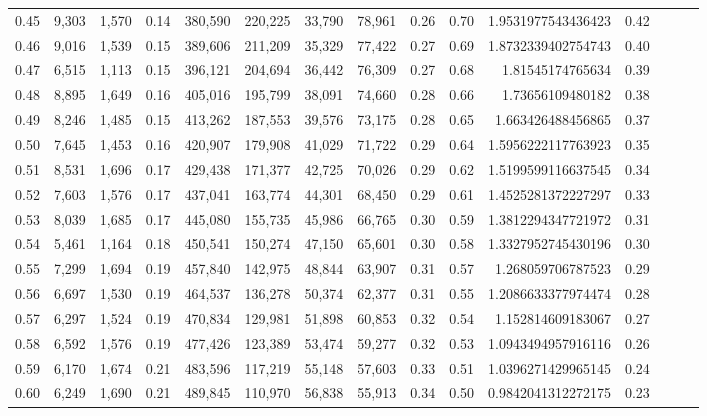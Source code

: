 \begin{tabular}{rrrrrrrrrrrrrrr}
0.45 &   9,303 &  1,570 &  0.14 &  380,590 &  220,225 &   33,790 &   78,961 &  0.26 &  0.70 &    1.9531977543436423 &      0.42 \\
0.46 &   9,016 &  1,539 &  0.15 &  389,606 &  211,209 &   35,329 &   77,422 &  0.27 &  0.69 &    1.8732339402754743 &      0.40 \\
0.47 &   6,515 &  1,113 &  0.15 &  396,121 &  204,694 &   36,442 &   76,309 &  0.27 &  0.68 &      1.81545174765634 &      0.39 \\
0.48 &   8,895 &  1,649 &  0.16 &  405,016 &  195,799 &   38,091 &   74,660 &  0.28 &  0.66 &      1.73656109480182 &      0.38 \\
0.49 &   8,246 &  1,485 &  0.15 &  413,262 &  187,553 &   39,576 &   73,175 &  0.28 &  0.65 &     1.663426488456865 &      0.37 \\
0.50 &   7,645 &  1,453 &  0.16 &  420,907 &  179,908 &   41,029 &   71,722 &  0.29 &  0.64 &    1.5956222117763923 &      0.35 \\
0.51 &   8,531 &  1,696 &  0.17 &  429,438 &  171,377 &   42,725 &   70,026 &  0.29 &  0.62 &    1.5199599116637545 &      0.34 \\
0.52 &   7,603 &  1,576 &  0.17 &  437,041 &  163,774 &   44,301 &   68,450 &  0.29 &  0.61 &    1.4525281372227297 &      0.33 \\
0.53 &   8,039 &  1,685 &  0.17 &  445,080 &  155,735 &   45,986 &   66,765 &  0.30 &  0.59 &    1.3812294347721972 &      0.31 \\
0.54 &   5,461 &  1,164 &  0.18 &  450,541 &  150,274 &   47,150 &   65,601 &  0.30 &  0.58 &    1.3327952745430196 &      0.30 \\
0.55 &   7,299 &  1,694 &  0.19 &  457,840 &  142,975 &   48,844 &   63,907 &  0.31 &  0.57 &     1.268059706787523 &      0.29 \\
0.56 &   6,697 &  1,530 &  0.19 &  464,537 &  136,278 &   50,374 &   62,377 &  0.31 &  0.55 &    1.2086633377974474 &      0.28 \\
0.57 &   6,297 &  1,524 &  0.19 &  470,834 &  129,981 &   51,898 &   60,853 &  0.32 &  0.54 &     1.152814609183067 &      0.27 \\
0.58 &   6,592 &  1,576 &  0.19 &  477,426 &  123,389 &   53,474 &   59,277 &  0.32 &  0.53 &    1.0943494957916116 &      0.26 \\
0.59 &   6,170 &  1,674 &  0.21 &  483,596 &  117,219 &   55,148 &   57,603 &  0.33 &  0.51 &    1.0396271429965145 &      0.24 \\
0.60 &   6,249 &  1,690 &  0.21 &  489,845 &  110,970 &   56,838 &   55,913 &  0.34 &  0.50 &    0.9842041312272175 &      0.23 \\

\end{tabular}
